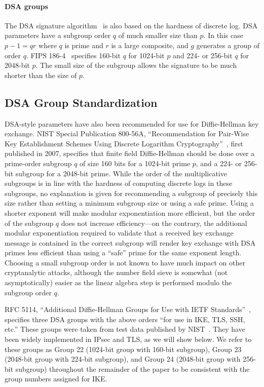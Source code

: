 \paragraph{DSA groups}
The DSA signature algorithm~\cite{dsa} is also based on the hardness of
discrete log.  DSA parameters have a subgroup order $q$ of much smaller size
than $p$.  In this case $p-1 = q r$ where $q$ is prime and $r$ is a large
composite, and $g$ generates a group of order $q$.  FIPS 186-4~\cite{dsa}
specifies 160-bit $q$ for 1024-bit $p$ and 224- or 256-bit $q$ for 2048-bit
$p$.  The small size of the subgroup allows the signature to be much shorter
than the size of $p$.

\subsection{DSA Group Standardization}

DSA-style parameters have also been recommended for use for Diffie-Hellman key
exchange.  NIST Special Publication 800-56A, ``Recommendation for Pair-Wise Key
Establishment Schemes Using Discrete Logarithm
Cryptography''~\cite{barker2007sp}, first published in 2007, specifies that
finite field Diffie-Hellman should be done over a prime-order subgroup $q$ of
size 160 bits for a 1024-bit prime $p$, and a 224- or 256-bit subgroup for a
2048-bit prime.  While the order of the multiplicative subgroups is in line
with the hardness of computing discrete logs in these subgroups, no explanation
is given for recommending a subgroup of precisely this size rather than setting
a minimum subgroup size or using a safe prime.  Using a shorter exponent will
make modular exponentiation more efficient, but the order of the subgroup $q$
does not increase efficiency---on the contrary, the additional modular exponentiation
required to validate that a received key exchange message is contained in the correct
subgroup will render key exchange with DSA primes less efficient than using a ``safe'' 
prime for the same exponent length.  Choosing a small subgroup order is not known to have
much impact on other cryptanalytic attacks, although the number field sieve is
somewhat (not asymptotically) easier as the linear algebra step is performed
modulo the subgroup order $q$.~\cite{weakdh-ccs15}

RFC 5114, ``Additional Diffie-Hellman Groups for Use with IETF
Standards''~\cite{rfc5114}, specifies three DSA groups with the above orders
``for use in IKE, TLS, SSH, etc.''  These groups were taken from test data
published by NIST~\cite{nistffcsamples}. They have been widely implemented in
IPsec and TLS, as we will show below. We refer to these groups as Group 22
(1024-bit group with 160-bit subgroup), Group 23 (2048-bit group with 224-bit
subgroup), and Group 24 (2048-bit group with 256-bit subgroup) throughout the
remainder of the paper to be consistent with the group numbers assigned for
IKE.

